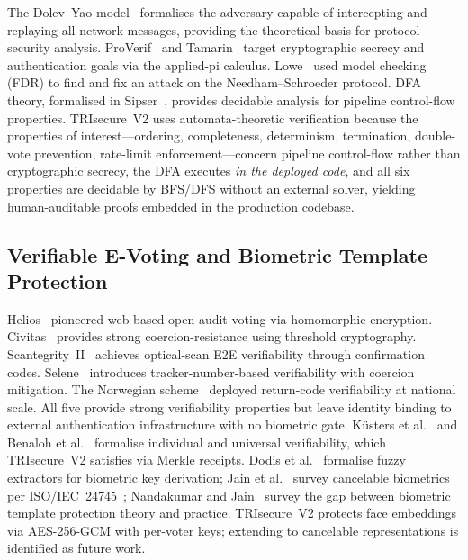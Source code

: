 \documentclass[pdflatex,sn-vancouver-num]{sn-jnl}%
\theoremstyle{thmstyleone}%
\theoremstyle{thmstyletwo}%
\theoremstyle{thmstylethree}%
\begin{document}
The Dolev--Yao model~\cite{dolev1983security} formalises the adversary capable
of intercepting and replaying all network messages, providing the theoretical
basis for protocol security analysis. ProVerif~\cite{blanchet2016proverif} and
Tamarin~\cite{meier2013tamarin} target cryptographic secrecy and authentication
goals via the applied-pi calculus. Lowe~\cite{lowe1996breaking} used model
checking (FDR) to find and fix an attack on the Needham--Schroeder protocol.
DFA theory, formalised in Sipser~\cite{sipser2012introduction}, provides
decidable analysis for pipeline control-flow properties. TRIsecure~V2 uses
automata-theoretic verification because the properties of
interest---ordering, completeness, determinism, termination, double-vote
prevention, rate-limit enforcement---concern pipeline control-flow rather than
cryptographic secrecy, the DFA executes \emph{in the deployed code}, and all
six properties are decidable by BFS/DFS without an external solver, yielding
human-auditable proofs embedded in the production codebase.

\subsection{Verifiable E-Voting and Biometric Template Protection}

Helios~\cite{adida2008helios} pioneered web-based open-audit voting via
homomorphic encryption. Civitas~\cite{clarkson2008civitas} provides strong
coercion-resistance using threshold cryptography.
Scantegrity~II~\cite{chaum2009scantegrity} achieves optical-scan E2E
verifiability through confirmation codes. Selene~\cite{ryan2016selene}
introduces tracker-number-based verifiability with coercion mitigation. The
Norwegian scheme~\cite{gjosteen2013norwegian} deployed return-code
verifiability at national scale. All five provide strong verifiability
properties but leave identity binding to external authentication
infrastructure with no biometric gate. K\"{u}sters et
al.~\cite{kusters2010accountability} and Benaloh et
al.~\cite{benaloh2011e2e} formalise individual and universal verifiability,
which TRIsecure~V2 satisfies via Merkle receipts. Dodis et
al.~\cite{dodis2004fuzzy} formalise fuzzy extractors for biometric key
derivation; Jain et al.~\cite{jain2008cancelable} survey cancelable
biometrics per ISO/IEC~24745~\cite{iso24745}; Nandakumar and
Jain~\cite{nandakumar2015biometric} survey the gap between biometric template
protection theory and practice. TRIsecure~V2 protects face embeddings via
AES-256-GCM with per-voter keys; extending to cancelable representations is
identified as future work.
\end{document}

